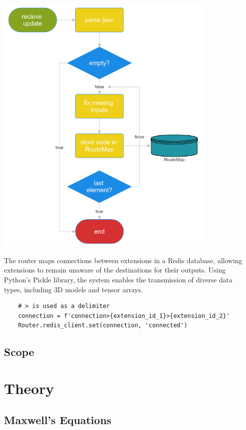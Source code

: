 \documentclass[11pt, a4paper, titlepage]{article}
\begin{document}
\begin{center}
	\includegraphics[width=0.8\textwidth]{nodegen-flow.png}
\end{center}

The router maps connections between extensions in a Redis database, allowing extensions to remain unaware of the destinations for their outputs. Using Python's Pickle library, the system enables the transmission of diverse data types, including 3D models and tensor arrays.
\begin{verbatim}
	# > is used as a delimiter
	connection = f'connection>{extension_id_1}>{extension_id_2}' 
	Router.redis_client.set(connection, 'connected')
\end{verbatim}






\newpage

\subsection{Scope}


\iffalse
\section{Theory}
\subsection{Maxwell's Equations}
\end{document}
